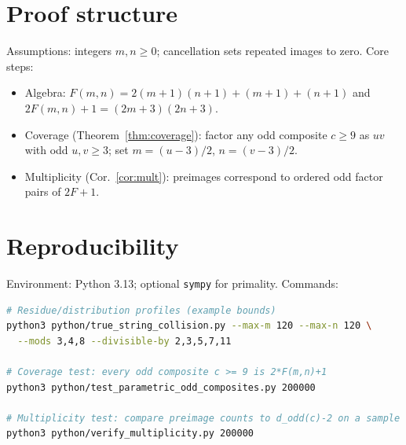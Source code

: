 \documentclass[12pt,a4paper]{article}
\begin{document}
\section{Proof structure}
Assumptions: integers \(m,n\ge 0\); cancellation sets repeated images to zero. Core steps:
\begin{itemize}
  \item Algebra: \(F(m,n)=2(m{+}1)(n{+}1)+(m{+}1)+(n{+}1)\) and \(2F(m,n)+1=(2m{+}3)(2n{+}3)\).
  \item Coverage (Theorem~\ref{thm:coverage}): factor any odd composite \(c\ge 9\) as \(uv\) with odd \(u,v\ge 3\); set \(m=(u{-}3)/2\), \(n=(v{-}3)/2\).
  \item Multiplicity (Cor.~\ref{cor:mult}): preimages correspond to ordered odd factor pairs of \(2F{+}1\).
\end{itemize}

\section{Reproducibility}
Environment: Python 3.13; optional \texttt{sympy} for primality. Commands:
\begin{lstlisting}[language=bash]
# Residue/distribution profiles (example bounds)
python3 python/true_string_collision.py --max-m 120 --max-n 120 \
  --mods 3,4,8 --divisible-by 2,3,5,7,11

# Coverage test: every odd composite c >= 9 is 2*F(m,n)+1
python3 python/test_parametric_odd_composites.py 200000

# Multiplicity test: compare preimage counts to d_odd(c)-2 on a sample
python3 python/verify_multiplicity.py 200000
\end{lstlisting}



\end{document}
